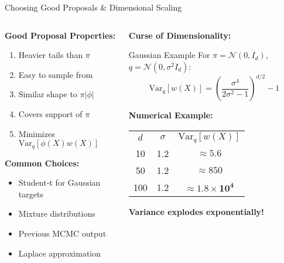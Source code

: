 \documentclass[aspectratio=169]{beamer}
\begin{document}
\begin{frame}{Choosing Good Proposals \& Dimensional Scaling}
	\begin{columns}
		\begin{column}{0.5\textwidth}
			\textbf{Good Proposal Properties:}
			\begin{enumerate}
				\item Heavier tails than $\pi$
				\item Easy to sample from
				\item Similar shape to $\pi|\phi|$
				\item Covers support of $\pi$
				\item Minimizes $\text{Var}_q[\phi(X)w(X)]$
			\end{enumerate}

			\vspace{0.3cm}
			\textbf{Common Choices:}
			\begin{itemize}
				\item Student-t for Gaussian targets
				\item Mixture distributions
				\item Previous MCMC output
				\item Laplace approximation
			\end{itemize}
		\end{column}

		\begin{column}{0.5\textwidth}
			\textbf{Curse of Dimensionality:}
			\begin{block}{Gaussian Example}
				For $\pi = \mathcal{N}(0,I_d)$, $q = \mathcal{N}(0,\sigma^2 I_d)$:
				$$\text{Var}_q[w(X)] = \left(\frac{\sigma^4}{2\sigma^2-1}\right)^{d/2} - 1$$
			\end{block}

			\textbf{Numerical Example:}
			\begin{center}
				\begin{tabular}{ccc}
					$d$ & $\sigma$ & $\text{Var}_q[w(X)]$               \\
					10  & 1.2      & $\approx 5.6$                      \\
					50  & 1.2      & $\approx 850$                      \\
					100 & 1.2      & $\approx \mathbf{1.8 \times 10^4}$ \\
				\end{tabular}
			\end{center}

			\textbf{Variance explodes exponentially!}
		\end{column}
	\end{columns}
\end{frame}
\end{document}
